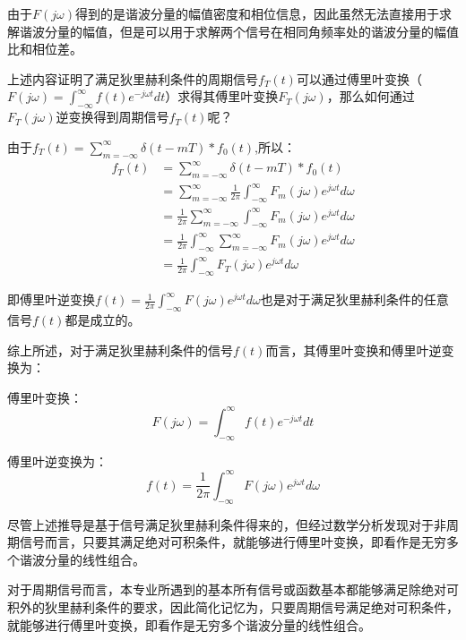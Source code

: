 \documentclass{article}
\numberwithin{equation}{section}
\numberwithin{figure}{section}
\begin{document}
由于$F(j\omega)$得到的是谐波分量的幅值密度和相位信息，因此虽然无法直接用于求解谐波分量的幅值，但是可以用于求解两个信号在相同角频率处的谐波分量的幅值比和相位差。

上述内容证明了满足狄里赫利条件的周期信号$f_T(t)$可以通过傅里叶变换（$F(j\omega)=\int_{-\infty}^{\infty}f(t)e^{-j\omega t}dt$）求得其傅里叶变换$F_T(j\omega)$，那么如何通过$F_T(j\omega)$逆变换得到周期信号$f_T(t)$呢？

由于$f_T(t)=\sum_{m=-\infty}^{\infty}\delta(t-mT)*f_0(t)$,所以：
\begin{equation}
    \begin{split}
        f_T(t)&=\sum_{m=-\infty}^{\infty}\delta(t-mT)*f_0(t)\\
        &=\sum_{m=-\infty}^{\infty}\frac{1}{2\pi}\int_{-\infty}^{\infty}F_m(j\omega)e^{j\omega t}d\omega\\
        &=\frac{1}{2\pi}\sum_{m=-\infty}^{\infty}\int_{-\infty}^{\infty}F_m(j\omega)e^{j\omega t}d\omega\\
        &=\frac{1}{2\pi}\int_{-\infty}^{\infty}\sum_{m=-\infty}^{\infty}F_m(j\omega)e^{j\omega t}d\omega\\
        &=\frac{1}{2\pi}\int_{-\infty}^{\infty}F_T(j\omega)e^{j\omega t}d\omega
    \end{split}
\end{equation}

即傅里叶逆变换$f(t)=\frac{1}{2\pi}\int_{-\infty}^{\infty}F(j\omega)e^{j\omega t}d\omega$也是对于满足狄里赫利条件的任意信号$f(t)$都是成立的。

综上所述，对于满足狄里赫利条件的信号$f(t)$而言，其傅里叶变换和傅里叶逆变换为：

傅里叶变换：
\begin{equation}
    F(j\omega)=\int_{-\infty}^{\infty}f(t)e^{-j\omega t}dt
\end{equation}

傅里叶逆变换为：
\begin{equation}
    f(t)=\frac{1}{2\pi}\int_{-\infty}^{\infty}F(j\omega)e^{j\omega t}d\omega
\end{equation}

尽管上述推导是基于信号满足狄里赫利条件得来的，但经过数学分析发现对于非周期信号而言，只要其满足绝对可积条件，就能够进行傅里叶变换，即看作是无穷多个谐波分量的线性组合。

对于周期信号而言，本专业所遇到的基本所有信号或函数基本都能够满足除绝对可积外的狄里赫利条件的要求，因此简化记忆为，只要周期信号满足绝对可积条件，就能够进行傅里叶变换，即看作是无穷多个谐波分量的线性组合。
\end{document}

